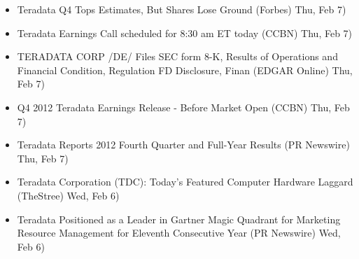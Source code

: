 \documentclass[11pt,asymmetric]{article}
\begin{document}
\begin{itemize}
\item Teradata Q4 Tops Estimates, But Shares Lose Ground (Forbes) Thu, Feb 7)
\item Teradata Earnings Call scheduled for 8:30 am ET today (CCBN) Thu, Feb 7)
\item TERADATA CORP /DE/ Files SEC form 8-K, Results of Operations and Financial Condition, Regulation FD Disclosure, Finan (EDGAR Online) Thu, Feb 7)
\item Q4 2012 Teradata Earnings Release - Before Market Open (CCBN) Thu, Feb 7)
\item Teradata Reports 2012 Fourth Quarter and Full-Year Results (PR Newswire) Thu, Feb 7)
\item Teradata Corporation (TDC): Today's Featured Computer Hardware Laggard (TheStree) Wed, Feb 6)
\item Teradata Positioned as a Leader in Gartner Magic Quadrant for Marketing Resource Management for Eleventh Consecutive Year (PR Newswire) Wed, Feb 6)
\end{itemize}
\end{document}
